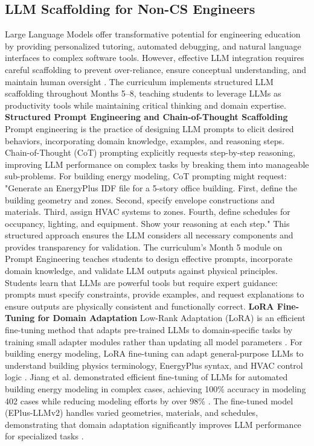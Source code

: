 \documentclass[12pt,a4paper]{article}
\begin{document}
\subsection{LLM Scaffolding for Non-CS Engineers}
Large Language Models offer transformative potential for engineering education by providing personalized tutoring, automated debugging, and natural language interfaces to complex software tools. However, effective LLM integration requires careful scaffolding to prevent over-reliance, ensure conceptual understanding, and maintain human oversight \cite{ref4}. The curriculum implements structured LLM scaffolding throughout Months 5--8, teaching students to leverage LLMs as productivity tools while maintaining critical thinking and domain expertise.
\textbf{Structured Prompt Engineering and Chain-of-Thought Scaffolding}
Prompt engineering is the practice of designing LLM prompts to elicit desired behaviors, incorporating domain knowledge, examples, and reasoning steps. Chain-of-Thought (CoT) prompting explicitly requests step-by-step reasoning, improving LLM performance on complex tasks by breaking them into manageable sub-problems.
For building energy modeling, CoT prompting might request: "Generate an EnergyPlus IDF file for a 5-story office building. First, define the building geometry and zones. Second, specify envelope constructions and materials. Third, assign HVAC systems to zones. Fourth, define schedules for occupancy, lighting, and equipment. Show your reasoning at each step." \cite{ref22} This structured approach ensures the LLM considers all necessary components and provides transparency for validation.
The curriculum's Month 5 module on Prompt Engineering teaches students to design effective prompts, incorporate domain knowledge, and validate LLM outputs against physical principles. Students learn that LLMs are powerful tools but require expert guidance: prompts must specify constraints, provide examples, and request explanations to ensure outputs are physically consistent and functionally correct.
\textbf{LoRA Fine-Tuning for Domain Adaptation}
Low-Rank Adaptation (LoRA) is an efficient fine-tuning method that adapts pre-trained LLMs to domain-specific tasks by training small adapter modules rather than updating all model parameters \cite{ref280}. For building energy modeling, LoRA fine-tuning can adapt general-purpose LLMs to understand building physics terminology, EnergyPlus syntax, and HVAC control logic \cite{ref280}.
Jiang et al. demonstrated efficient fine-tuning of LLMs for automated building energy modeling in complex cases, achieving 100\% accuracy in modeling 402 cases while reducing modeling efforts by over 98\% \cite{ref280}. The fine-tuned model (EPlus-LLMv2) handles varied geometries, materials, and schedules, demonstrating that domain adaptation significantly improves LLM performance for specialized tasks \cite{ref280}.
\end{document}
